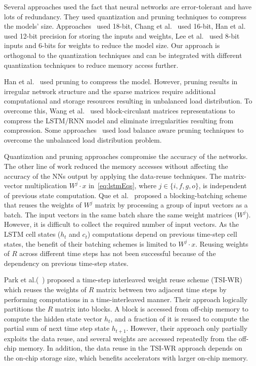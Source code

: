 Several approaches used the fact that neural networks are error-tolerant and have lots of redundancy. They used quantization and pruning techniques to compress the models' size. Approaches~\cite{ferreira2016fpga,wang2018c} used 18-bit, Chang et al.~\cite{chang2015recurrent} used 16-bit, Han et al.~\cite{han2017ese} used 12-bit precision for storing the inputs and weights, Lee et al.~\cite{lee2016fpga} used 8-bit inputs and 6-bits for weights to reduce the model size. Our approach is orthogonal to the quantization techniques and can be integrated with different quantization techniques to reduce memory access further. 

Han et al.~\cite{han2017ese} used pruning to compress the model. However, pruning results in irregular network structure and the sparse matrices require additional computational and storage resources resulting in unbalanced load distribution. To overcome this, Wang et al.~\cite{wang2018c} used block-circulant matrices representations to compress the LSTM/RNN model and eliminate irregularities resulting from compression. Some approaches~\cite{park2019balancing,han2017ese,park2018maximizing} used load balance aware pruning techniques to overcome the unbalanced load distribution problem. 

Quantization and pruning approaches compromise the accuracy of the networks. The other line of work reduced the memory accesses without affecting the accuracy of the NNs output by applying the data-reuse techniques. The matrix-vector multiplication $W^j{\cdot}x$ in~\eqref{eq:lstmEqs}, where $j\in \{i,f,g,o\}$, is independent of previous state computation. Que et al.~\cite{que2019efficient} proposed a blocking-batching scheme that reuses the weights of $W^j$ matrix by processing a group of input vectors as a batch. The input vectors in the same batch share the same weight matrices ($W^j$). However, it is difficult to collect the required number of input vectors. As the LSTM cell states ($h_t$ and $c_t$) computations depend on previous time-step cell states, the benefit of their batching schemes is limited to $W^j{\cdot}x$. Reusing weights of $R$ across different time steps has not been successful because of the dependency on previous time-step states.

Park et al.(~\cite{park2020time}) proposed a time-step interleaved weight reuse scheme (TSI-WR) which reuses the weights of $R$ matrix between two adjacent time steps by performing computations in a time-interleaved manner. Their approach logically partitions the $R$ matrix into blocks. A block is accessed from off-chip memory to compute the hidden state vector $h_t$, and a fraction of it is reused to compute the partial sum of next time step state $h_{t+1}$. However, their approach only partially exploits the data reuse, and several weights are accessed repeatedly from the off-chip memory. In addition, the data reuse in the TSI-WR approach depends on the on-chip storage size, which benefits accelerators with larger on-chip memory.

